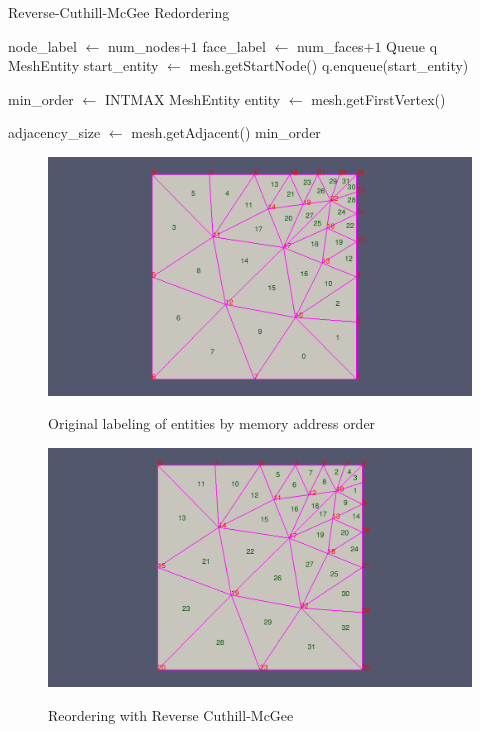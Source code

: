 \documentclass{article}
\begin{document}
		
\begin{algorithm}
\caption{Reverse-Cuthill-McGee Redordering}\label{RCM}
\begin{algorithmic}
	\State node\_label $\gets$ num\_nodes$ + 1$
	\State face\_label $\gets$ num\_faces$ + 1$
	\State Queue q
	\State MeshEntity start\_entity $\gets$ mesh.getStartNode()
	\State q.enqueue(start\_entity)

	\EndWhile


\EndProcedure
\State

	\State{}
	\State min\_order $\gets$ INTMAX
	\State MeshEntity entity $\gets$ mesh.getFirstVertex()

		
			\State adjacency\_size $\gets$ mesh.getAdjacent()
			\If{}
				\State min\_order
			\EndIf

		\EndIf

	\EndWhile

\EndProcedure
\end{algorithmic}
\end{algorithm}

\begin{figure}[h]
\caption{Original labeling of entities by memory address order}
{\includegraphics[width = 15cm ]{pre_b}}
\centering
\end{figure}

\begin{figure}[h]
\caption{Reordering with Reverse Cuthill-McGee}
{\includegraphics[width = 15cm ]{post_b}}
\centering
\end{figure}
\end{document}
